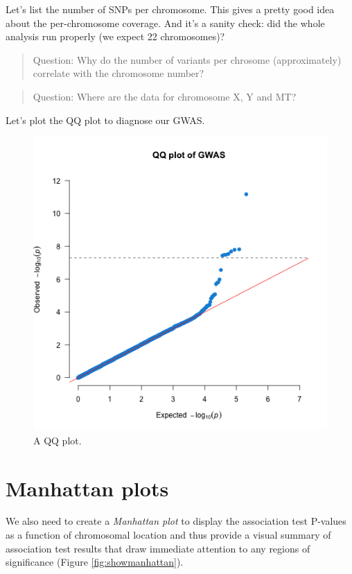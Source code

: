 \documentclass[
]{book}
\begin{document}
Let's list the number of SNPs per chromosome. This gives a pretty good idea about the per-chromosome coverage. And it's a sanity check: did the whole analysis run properly (we expect 22 chromosomes)?

\begin{quote}
Question: Why do the number of variants per chrosome (approximately) correlate with the chromosome number?
\end{quote}

\begin{quote}
Question: Where are the data for chromosome X, Y and MT?
\end{quote}

Let's plot the QQ plot to diagnose our GWAS.

\begin{figure}[H]

{\centering \includegraphics[width=0.85\linewidth]{img/_gwas_dummy/show-qq} 

}

\caption{A QQ plot.}\label{fig:show-qq}
\end{figure}

\hypertarget{manhattan-plots}{%
\section{Manhattan plots}\label{manhattan-plots}}

We also need to create a \emph{Manhattan plot} to display the association test P-values as a function of chromosomal location and thus provide a visual summary of association test results that draw immediate attention to any regions of significance (Figure \ref{fig:showmanhattan}).
\end{document}
